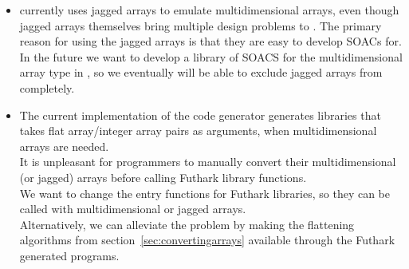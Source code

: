 \begin{itemize}
\item \fshark{} currently uses jagged arrays to emulate multidimensional
  arrays, even though jagged arrays themselves bring multiple design problems to
  \fshark{}. The primary reason for using the jagged arrays is that they are easy to develop SOACs for.
  In the future we want to develop a library of SOACS for the
  multidimensional array type in \fsharp{}, so we eventually will be able to
  exclude jagged arrays from \fshark{} completely.

\item The current implementation of the \csharp{} code generator generates
  \csharp{} libraries that takes flat array/integer array pairs as arguments,
  when multidimensional arrays are needed.\\
  It is unpleasant for programmers to manually convert their multidimensional (or jagged) arrays
  before calling Futhark library functions.\\
  We want to change the entry functions for Futhark \csharp{} libraries, so they
  can be called with multidimensional or jagged arrays.
  \\
  Alternatively, we can alleviate the problem by making the flattening algorithms from
  section~\ref{sec:convertingarrays} available through the Futhark generated
  \csharp{} programs.

\end{itemize}



